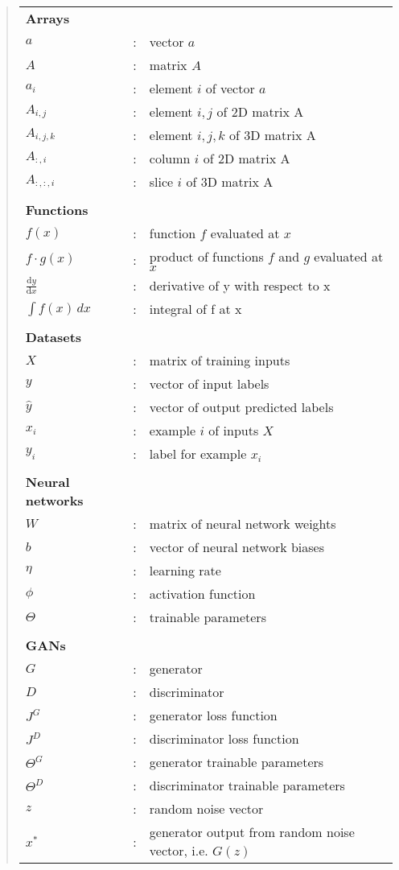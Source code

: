 \documentclass[
    author={Kai Hulme},
    supervisor={Dr Jon Bird},
    degree={BSc},
    title={Generative Adversarial Networks as an Augmentation Technique},
    subtitle={for Alzheimer's Disease Detection in MRI Volumes},
    type={Research},
    year={2021} 
]{dissertation}
\begin{document}
\begin{quote}
\noindent
\begin{tabular}{lcl}

\textbf{Arrays}\\
$a$ & : & vector $a$ \\
$A$ & : & matrix $A$ \\
$a_i$ & : & element $i$ of vector $a$ \\
$A_{i,j}$ & : & element $i,j$ of 2D matrix A \\
$A_{i,j,k}$ & : & element $i,j,k$ of 3D matrix A \\
$A_{:,i}$ & : & column $i$ of 2D matrix A \\
$A_{:,:,i}$ & : & slice $i$ of 3D matrix A \\
\\

\textbf{Functions}\\
$f(x)$ & : & function $f$ evaluated at $x$ \\
$f \cdot g(x)$ & : & product of functions $f$ and $g$ evaluated at $x$ \\
$\frac{\mathrm{d}y}{\mathrm{d}x}$ & : & derivative of y with respect to x \\
$\int f(x) \, dx \ $ & : & integral of f at x \\
\\

\textbf{Datasets}\\
$X$ & : & matrix of training inputs \\
$y$ & : & vector of input labels \\
$\hat{y}$ & : & vector of output predicted labels \\
$x_i$ & : & example $i$ of inputs $X$ \\
$y_i$ & : & label for example $x_i$ \\
\\

\textbf{Neural networks}\\
$W$ & : & matrix of neural network weights \\
$b$ & : & vector of neural network biases \\
$\eta$ & : & learning rate \\
$\phi$ & : & activation function \\
$\Theta$ & : & trainable parameters \\
\\

\textbf{GANs}\\
$G$  &: & generator \\
$D$ & : & discriminator \\
$J^G$ & : & generator loss function \\
$J^D$ & : & discriminator loss function \\
$\Theta^G$ & : & generator trainable parameters \\
$\Theta^D$ & : & discriminator trainable parameters \\
$z$ & : & random noise vector \\
$x^*$ & : & generator output from random noise vector, i.e. $G(z)$ \\


\end{tabular}
\end{quote}
\end{document}
